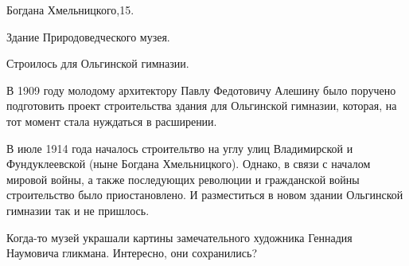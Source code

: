  
 
 
 
 


Богдана Хмельницкого,15.

Здание Природоведческого музея.

Строилось для Ольгинской гимназии.

В 1909 году молодому архитектору Павлу Федотовичу Алешину было поручено
подготовить проект строительства здания для Ольгинской гимназии, которая, на
тот момент стала нуждаться в расширении.

В июле 1914 года началось строительтво на углу улиц Владимирской и
Фундуклеевской (ныне Богдана Хмельницкого). Однако, в связи с началом мировой
войны, а также последующих революции и гражданской войны строительство было
приостановлено. И разместиться в новом здании Ольгинской гимназии так и не
пришлось.


Когда-то музей украшали картины замечательного художника Геннадия Наумовича
гликмана. Интересно, они сохранились?
